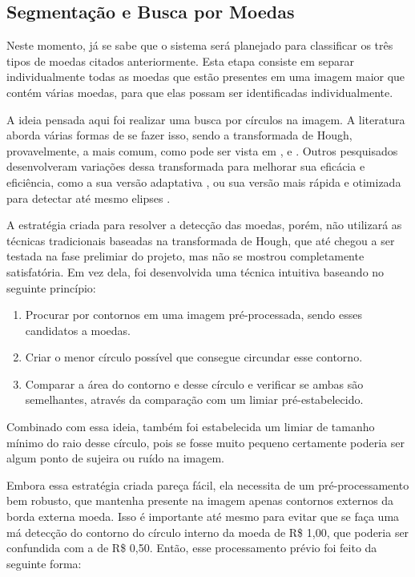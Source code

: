 \documentclass[10pt,journal,compsoc]{IEEEtran}
\begin{document}
\subsection{Segmentação e Busca por Moedas}
\label{sec:metodologia-segmentacao}

Neste momento, já se sabe que o sistema será planejado para classificar os três tipos de moedas citados anteriormente. Esta etapa consiste em separar individualmente todas as moedas que estão presentes em uma imagem maior que contém várias moedas, para que elas possam ser identificadas individualmente.

A ideia pensada aqui foi realizar uma busca por círculos na imagem. A literatura aborda várias formas de se fazer isso, sendo a transformada de Hough, provavelmente, a mais comum, como pode ser vista em \cite{ioannou1999circle}, \cite{kerbyson1995circle} e \cite{yuen1990comparative}. Outros pesquisados desenvolveram variações dessa transformada para melhorar sua eficácia e eficiência, como a sua versão adaptativa \cite{illingworth1987adaptive}, ou sua versão mais rápida e otimizada para detectar até mesmo elipses \cite{guil1997lower}.

A estratégia criada para resolver a detecção das moedas, porém, não utilizará as técnicas tradicionais baseadas na transformada de Hough, que até chegou a ser testada na fase prelimiar do projeto, mas não se mostrou completamente satisfatória. Em vez dela, foi desenvolvida uma técnica intuitiva baseando no seguinte princípio:

\begin{enumerate}
\item Procurar por contornos em uma imagem pré-processada, sendo esses candidatos a moedas.
\item Criar o menor círculo possível que consegue circundar esse contorno.
\item Comparar a área do contorno e desse círculo e verificar se ambas são semelhantes, através da comparação com um limiar pré-estabelecido.
\end{enumerate}

Combinado com essa ideia, também foi estabelecida um limiar de tamanho mínimo do raio desse círculo, pois se fosse muito pequeno certamente poderia ser algum ponto de sujeira ou ruído na imagem.

Embora essa estratégia criada pareça fácil, ela necessita de um pré-processamento bem robusto, que mantenha presente na imagem apenas contornos externos da borda externa moeda. Isso é importante até mesmo para evitar que se faça uma má detecção do contorno do círculo interno da moeda de R\$ 1,00, que poderia ser confundida com a de R\$ 0,50. Então, esse processamento prévio foi feito da seguinte forma:
\end{document}
